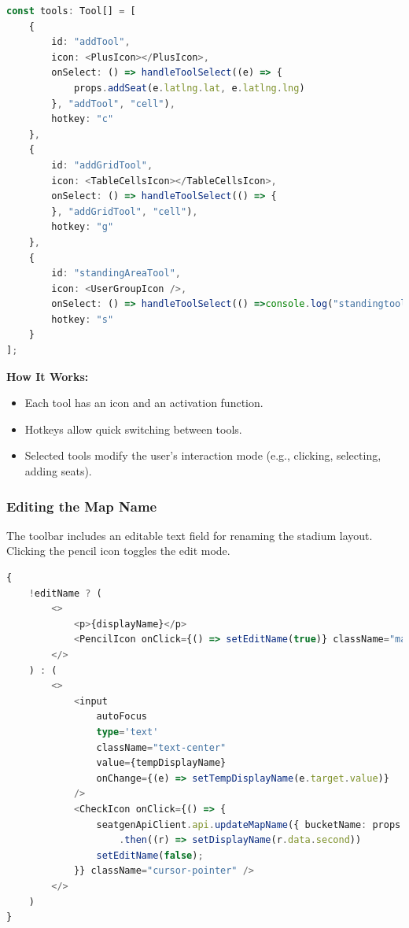\begin{lstlisting}[language=TypeScript, caption=Defining Available Tools, label=lst:toolbar-tools]
const tools: Tool[] = [
    {
        id: "addTool",
        icon: <PlusIcon></PlusIcon>,
        onSelect: () => handleToolSelect((e) => {
            props.addSeat(e.latlng.lat, e.latlng.lng)
        }, "addTool", "cell"),
        hotkey: "c"
    },
    {
        id: "addGridTool",
        icon: <TableCellsIcon></TableCellsIcon>,
        onSelect: () => handleToolSelect(() => {
        }, "addGridTool", "cell"),
        hotkey: "g"
    },
    {
        id: "standingAreaTool",
        icon: <UserGroupIcon />,
        onSelect: () => handleToolSelect(() =>console.log("standingtool"), "standingAreaTool", "crosshair"),
        hotkey: "s"
    }
];
\end{lstlisting}

\textbf{How It Works:}
\begin{itemize}
    \item Each tool has an icon and an activation function.
    \item Hotkeys allow quick switching between tools.
    \item Selected tools modify the user’s interaction mode (e.g., clicking, selecting, adding seats).
\end{itemize}

\subsubsection{Editing the Map Name}
The toolbar includes an editable text field for renaming the stadium layout. Clicking the pencil icon toggles the edit mode.

\begin{lstlisting}[language=TypeScript, caption=Editing Map Name, label=lst:toolbar-edit-name]
{
    !editName ? (
        <>
            <p>{displayName}</p>
            <PencilIcon onClick={() => setEditName(true)} className="mapNameEdit cursor-pointer" />
        </>
    ) : (
        <>
            <input
                autoFocus
                type='text'
                className="text-center"
                value={tempDisplayName}
                onChange={(e) => setTempDisplayName(e.target.value)}
            />
            <CheckIcon onClick={() => {
                seatgenApiClient.api.updateMapName({ bucketName: props.mapDto.bucketName, mapName: props.mapDto.mapName, displayName: tempDisplayName })
                    .then((r) => setDisplayName(r.data.second))
                setEditName(false);
            }} className="cursor-pointer" />
        </>
    )
}
\end{lstlisting}

